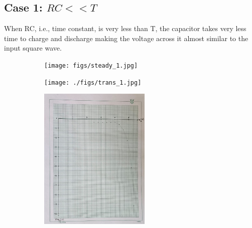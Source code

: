 \documentclass[a4paper,12pt]{article}
\begin{document}
\subsection*{Case 1: $RC << T$}
When RC, i.e., time constant, is very less than T, the capacitor takes very less time to charge and discharge making the voltage across it almost similar to the input square wave.
\begin{figure}[h!]
	\begin{subfigure}[b]{10pt}
	\texttt{[image: figs/steady\_1.jpg]}
	\end{subfigure}
	\hspace{135pt}
	\begin{subfigure}[b]{10pt}
	\texttt{[image: ./figs/trans\_1.jpg]}
	\end{subfigure}
	\hspace{135pt}
	\begin{subfigure}[b]{10pt}
	\includegraphics[width = 150pt]{./figs/fig1.png}
	\end{subfigure}
\end{figure}
\end{document}
